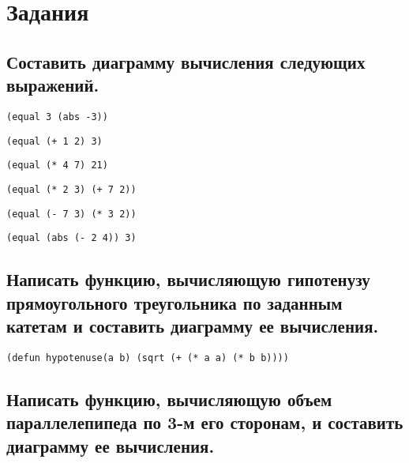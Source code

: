 \chapter{Задания}

\section{Составить диаграмму вычисления следующих выражений.}

\begin{lstlisting}
(equal 3 (abs -3))
\end{lstlisting}
\vspace{60mm}

\begin{lstlisting}
(equal (+ 1 2) 3)
\end{lstlisting}
\vspace{60mm}

\begin{lstlisting}
(equal (* 4 7) 21)
\end{lstlisting}
\vspace{60mm}

\begin{lstlisting}
(equal (* 2 3) (+ 7 2))
\end{lstlisting}
\vspace{60mm}

\begin{lstlisting}
(equal (- 7 3) (* 3 2))
\end{lstlisting}
\vspace{60mm}

\begin{lstlisting}
(equal (abs (- 2 4)) 3)
\end{lstlisting}
\vspace{60mm}

\clearpage

\section{Написать функцию, вычисляющую гипотенузу прямоугольного треугольника по заданным катетам и составить диаграмму ее вычисления.}

\begin{lstlisting}
(defun hypotenuse(a b) (sqrt (+ (* a a) (* b b))))
\end{lstlisting}
\vspace{80mm}

\section{Написать функцию, вычисляющую объем параллелепипеда по 3-м его сторонам, и составить диаграмму ее вычисления.}

